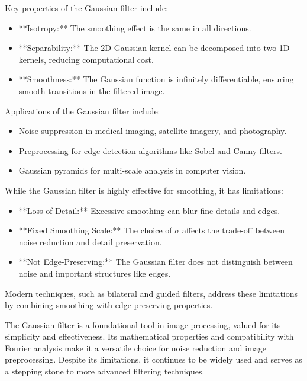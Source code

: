 \documentclass[11pt]{book}
\begin{document}
Key properties of the Gaussian filter include:
\begin{itemize}
    \item **Isotropy:** The smoothing effect is the same in all directions.
    \item **Separability:** The 2D Gaussian kernel can be decomposed into two 1D kernels, reducing computational cost.
    \item **Smoothness:** The Gaussian function is infinitely differentiable, ensuring smooth transitions in the filtered image.
\end{itemize}

Applications of the Gaussian filter include:
\begin{itemize}
    \item Noise suppression in medical imaging, satellite imagery, and photography.
    \item Preprocessing for edge detection algorithms like Sobel and Canny filters.
    \item Gaussian pyramids for multi-scale analysis in computer vision.
\end{itemize}

While the Gaussian filter is highly effective for smoothing, it has limitations:
\begin{itemize}
    \item **Loss of Detail:** Excessive smoothing can blur fine details and edges.
    \item **Fixed Smoothing Scale:** The choice of $\sigma$ affects the trade-off between noise reduction and detail preservation.
    \item **Not Edge-Preserving:** The Gaussian filter does not distinguish between noise and important structures like edges.
\end{itemize}

Modern techniques, such as bilateral and guided filters, address these limitations by combining smoothing with edge-preserving properties.

The Gaussian filter is a foundational tool in image processing, valued for its simplicity and effectiveness. Its mathematical properties and compatibility with Fourier analysis make it a versatile choice for noise reduction and image preprocessing. Despite its limitations, it continues to be widely used and serves as a stepping stone to more advanced filtering techniques.


\backmatter
\end{document}
